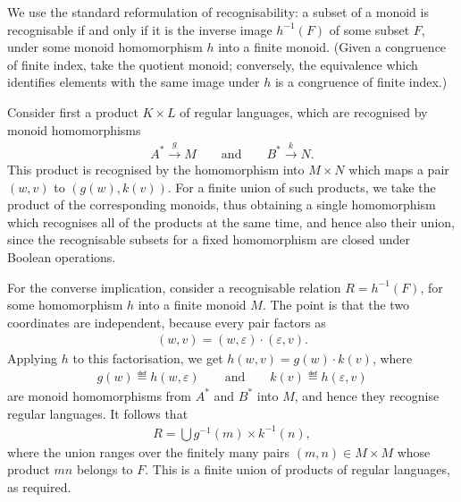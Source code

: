 {
    We use the standard reformulation of recognisability: a subset of a monoid is recognisable if and only if it is the inverse image $h^{-1}(F)$ of some subset $F$, under some monoid homomorphism $h$ into a finite monoid. (Given a congruence of finite index, take the quotient monoid; conversely, the equivalence which identifies elements with the same image under $h$ is a congruence of finite index.)

    Consider first a product $K \times L$ of regular languages, which are recognised by monoid homomorphisms
    \begin{align*}
    A^* \xrightarrow g M \qquad \text{and} \qquad B^* \xrightarrow k N.
    \end{align*}
    This product is recognised by the homomorphism into $M \times N$ which maps a pair $(w,v)$ to $(g(w),k(v))$. For a finite union of such products, we take the product of the corresponding monoids, thus obtaining a single homomorphism which recognises all of the products at the same time, and hence also their union, since the recognisable subsets for a fixed homomorphism are closed under Boolean operations.

    For the converse implication, consider a recognisable relation $R = h^{-1}(F)$, for some homomorphism $h$ into a finite monoid $M$. The point is that the two coordinates are independent, because every pair factors as
    \begin{align*}
    (w,v) = (w,\varepsilon) \cdot (\varepsilon,v).
    \end{align*}
    Applying $h$ to this factorisation, we get $h(w,v) = g(w) \cdot k(v)$, where
    \begin{align*}
    g(w) \eqdef h(w,\varepsilon) \qquad \text{and} \qquad k(v) \eqdef h(\varepsilon,v)
    \end{align*}
    are monoid homomorphisms from $A^*$ and $B^*$ into $M$, and hence they recognise regular languages. It follows that
    \begin{align*}
    R = \bigcup g^{-1}(m) \times k^{-1}(n),
    \end{align*}
    where the union ranges over the finitely many pairs $(m,n) \in M \times M$ whose product $mn$ belongs to $F$. This is a finite union of products of regular languages, as required.
}